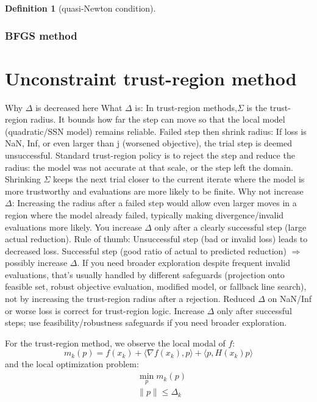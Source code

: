\documentclass[a4paper,11pt,fleqn, draft]{book}
\theoremstyle{definition}
\newtheorem{definition}{Definition}[section]
\theoremstyle{remark}
\begin{document}
\begin{definition}[quasi-Newton condition]
	
\end{definition}

\subsubsection{BFGS method}



\section{Unconstraint trust-region method}
Why $\Delta$ is decreased here
What $\Delta$ is: In trust-region methods,$\Sigma$ is the trust-region radius. It bounds how far the step can move so that the local model (quadratic/SSN model) remains reliable.
Failed step then shrink radius: If loss is NaN, Inf, or even larger than j (worsened objective), the trial step is deemed unsuccessful. Standard trust-region policy is to reject the step and reduce the radius: the model was not accurate at that scale, or the step left the domain. Shrinking $\Sigma$ keeps the next trial closer to the current iterate where the model is more trustworthy and evaluations are more likely to be finite.
Why not increase $\Delta$: Increasing the radius after a failed step would allow even larger moves in a region where the model already failed, typically making divergence/invalid evaluations more likely. You increase $\Delta$ only after a clearly successful step (large actual reduction).
Rule of thumb:
Unsuccessful step (bad or invalid loss) leads to decreased loss.
Successful step (good ratio of actual to predicted reduction) $\Rightarrow$ possibly increase $\Delta$.
If you need broader exploration despite frequent invalid evaluations, that’s usually handled by different safeguards (projection onto feasible set, robust objective evaluation, modified model, or fallback line search), not by increasing the trust-region radius after a rejection.
Reduced $\Delta$ on NaN/Inf or worse loss is correct for trust-region logic.
Increase $\Delta$ only after successful steps; use feasibility/robustness safeguards if you need broader exploration.



For the trust-region method, we observe the local modal of $f$:
\[
m_k(p) = f(x_k) + \langle \nabla f(x_k), p \rangle + \langle p, H(x_k) p \rangle
\]
and the local optimization problem:
\begin{align*}
	\tag{QP}
	& \min_p m_k(p)\\
	& \|p\| \le \Delta_k 
\end{align*}
\end{document}
